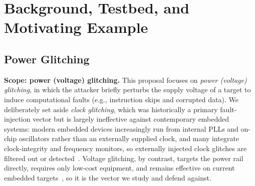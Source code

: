\section{Background, Testbed, and Motivating Example}


\subsection{Power Glitching}

\noindent\textbf{Scope: power (voltage) glitching.}
This proposal focuses on \emph{power (voltage) glitching}, in which the attacker briefly perturbs the supply voltage of a target to induce computational faults (e.g., instruction skips and corrupted data).
We deliberately set aside \emph{clock glitching}, which was historically a primary fault-injection vector but is largely ineffective against contemporary embedded systems: modern embedded devices increasingly run from internal PLLs and on-chip oscillators rather than an externally supplied clock, and many integrate clock-integrity and frequency monitors, so externally injected clock glitches are filtered out or detected~\cite{selmke2019peak, balasch2011depth}.
Voltage glitching, by contrast, targets the power rail directly, requires only low-cost equipment, and remains effective on current embedded targets~\cite{sass2023multi, ruminot2023novel}, so it is the vector we study and defend against.

